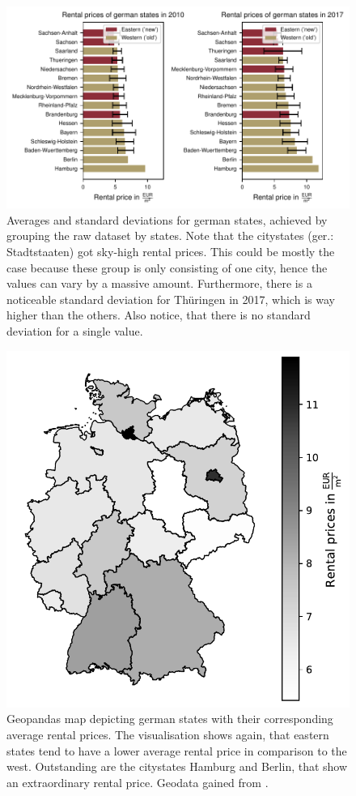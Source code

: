 \documentclass{article}
\begin{document}
	\begin{figure}[htp]
	\centering
	\includegraphics{../fig/figures/barchart_state_comparison.pdf}
	\caption{Averages and standard deviations for german states, achieved by grouping the raw dataset by states. Note that the citystates (ger.: Stadtstaaten) got sky-high rental prices. This could be mostly the case because these group is only consisting of one city, hence the values can vary by a massive amount. Furthermore, there is a noticeable standard deviation for Thüringen in 2017, which is way higher than the others. Also notice, that there is no standard deviation for a single value.}
	\label{barchart_state_comparison}
	\end{figure}
	\begin{figure}
	\centering
	\includegraphics[width=0.5\linewidth]{../fig/figures/geodata_2017.pdf}
	\caption{Geopandas map depicting german states with their corresponding average rental prices. The visualisation shows again, that eastern states tend to have a lower average rental price in comparison to the west. Outstanding are the citystates Hamburg and Berlin, that show an extraordinary rental price. Geodata gained from \cite{geo_data}.}
	\label{geodata_2017}
	\end{figure}
	\newpage
	
\end{document}
